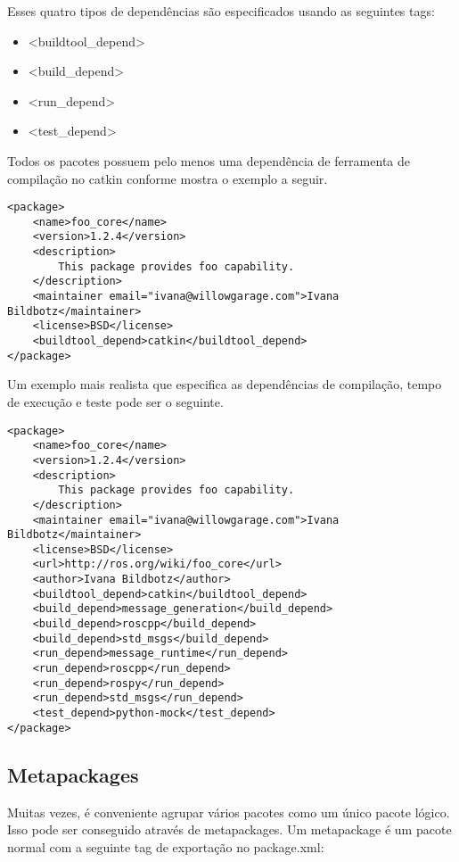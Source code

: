 Esses quatro tipos de dependências são especificados usando as seguintes tags:

\begin{itemize}
	\setlength{\itemsep}{1pt}
	\setlength{\parskip}{0pt}
	\setlength{\parsep}{0pt}
	\item <buildtool\_depend>
	\item<build\_depend>
	\item<run\_depend>
	\item<test\_depend>
\end{itemize}

Todos os pacotes possuem pelo menos uma dependência de ferramenta de compilação no catkin conforme mostra o exemplo a seguir.

\begin{verbatim}
<package>
	<name>foo_core</name>
	<version>1.2.4</version>
	<description>
		This package provides foo capability.
	</description>
	<maintainer email="ivana@willowgarage.com">Ivana 	Bildbotz</maintainer>
	<license>BSD</license>
	<buildtool_depend>catkin</buildtool_depend>
</package>
\end{verbatim}

Um exemplo mais realista que especifica as dependências de compilação, tempo de execução e teste pode ser o seguinte.

\begin{verbatim}
<package>
	<name>foo_core</name>
	<version>1.2.4</version>
	<description>
		This package provides foo capability.
	</description>
	<maintainer email="ivana@willowgarage.com">Ivana Bildbotz</maintainer>
	<license>BSD</license>
	<url>http://ros.org/wiki/foo_core</url>
	<author>Ivana Bildbotz</author>
	<buildtool_depend>catkin</buildtool_depend>
	<build_depend>message_generation</build_depend>
	<build_depend>roscpp</build_depend>
	<build_depend>std_msgs</build_depend>
	<run_depend>message_runtime</run_depend>
	<run_depend>roscpp</run_depend>
	<run_depend>rospy</run_depend>
	<run_depend>std_msgs</run_depend>
	<test_depend>python-mock</test_depend>
</package>
\end{verbatim}


\subsection{Metapackages}

Muitas vezes, é conveniente agrupar vários pacotes como um único pacote lógico. Isso pode ser conseguido através de metapackages. Um metapackage é um pacote normal com a seguinte tag de exportação no package.xml:


